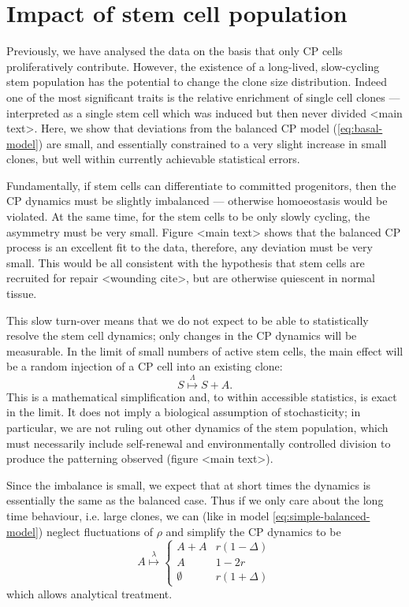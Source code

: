 \documentclass[10pt,UKenglish]{article}
\begin{document}
\section{\label{sec:stem}Impact of stem cell population}

Previously, we have analysed the data on the basis that only CP cells proliferatively contribute. However, the existence of a long-lived, slow-cycling stem population has the potential to change the clone size distribution. Indeed one of the most significant traits is the relative enrichment of single cell clones --- interpreted as a single stem cell which was induced but then never divided <main text>. Here, we show that deviations from the balanced CP model (\ref{eq:basal-model}) are small, and essentially constrained to a very slight increase in small clones, but well within currently achievable statistical errors.

Fundamentally, if stem cells can differentiate to committed progenitors, then the CP dynamics must be slightly imbalanced --- otherwise homoeostasis would be violated. At the same time, for the stem cells to be only slowly cycling, the asymmetry must be very small. Figure <main text> shows that the balanced CP process is an excellent fit to the data, therefore, any deviation must be very small. This would be all consistent with the hypothesis that stem cells are recruited for repair <wounding cite>, but are otherwise quiescent in normal tissue.

This slow turn-over means that we do not expect to be able to statistically resolve the stem cell dynamics; only changes in the CP dynamics will be measurable. In the limit of small numbers of active stem cells, the main effect will be a random injection of a CP cell into an existing clone: 
\begin{equation}
S \overset{\Lambda}{\longmapsto} S+A. \label{eq:stem-division-model}
\end{equation}
This is a mathematical simplification and, to within accessible statistics, is exact in the limit. It does not imply a biological assumption of stochasticity; in particular, we are not ruling out other dynamics of the stem population, which must necessarily include self-renewal and environmentally controlled division to produce the patterning observed (figure <main text>).

Since the imbalance is small, we expect that at short times the dynamics is essentially the same as the balanced case. Thus if we only care about the long time behaviour, i.e. large clones, we can (like in model \ref{eq:simple-balanced-model}) neglect fluctuations of $\rho$ and simplify the CP dynamics to be
\begin{equation}
A \overset{\lambda}{\longmapsto} \begin{cases}
A+A & r(1 - \Delta) \\
A & 1 - 2r \\
\emptyset & r(1 + \Delta)
\end{cases}\label{eq:subcritical-cp-model}
\end{equation} which allows analytical treatment.
\end{document}
